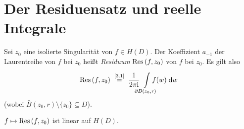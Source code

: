 \documentclass[a4paper,twoside,DIV15,BCOR12mm]{scrbook}
\begin{document}


\section{Der Residuensatz und reelle Integrale}

\begin{dfn} \label{dfn2.9}
  Sei $z_0$ eine isolierte Singularität von $f\in H(D)$. Der Koeffizient $a_{-1}$ der Laurentreihe von $f$ bei $z_0$ heißt
  \emph{Residuum} $\mathrm{Res}\left(f,z_0\right)$ von $f$ bei $z_0$. Es gilt also
  \[ \Res{f}{z_0} \nach{=}{\eqref{3.1}} \frac{1}{2\pi\i} \!\!\!\!\Integral{\partial B(z_0,r)}{}{\!\!\!\!\!\!f(w)}{w} \]
  (wobei $\bar{B}(z_0,r)\setminus\{z_0\} \subseteq D$).
\end{dfn}
\begin{bem*}
  $f\mapsto\mathrm{Res}\left(f,z_0\right)$ ist linear auf $H(D)$.
\end{bem*}
\end{document}
